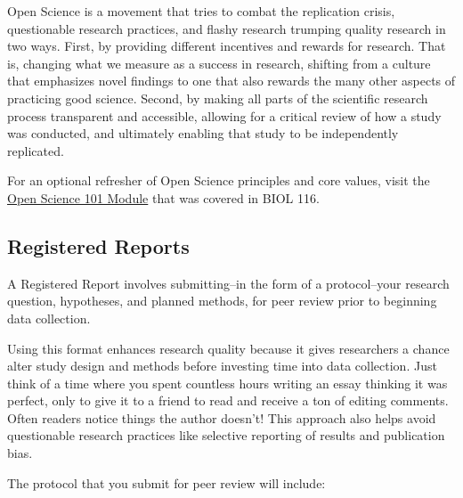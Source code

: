 \documentclass[
]{book}
\begin{document}
Open Science is a movement that tries to combat the replication crisis, questionable research practices, and flashy research trumping quality research in two ways. First, by providing different incentives and rewards for research. That is, changing what we measure as a success in research, shifting from a culture that emphasizes novel findings to one that also rewards the many other aspects of practicing good science. Second, by making all parts of the scientific research process transparent and accessible, allowing for a critical review of how a study was conducted, and ultimately enabling that study to be independently replicated.

For an optional refresher of Open Science principles and core values, visit the \href{https://ubco-biology.github.io/OS-Introduction/principles-of-open-science.html}{Open Science 101 Module} that was covered in BIOL 116.

\hypertarget{registered-reports}{%
\subsection*{Registered Reports}\label{registered-reports}}

A Registered Report involves submitting--in the form of a protocol--your research question, hypotheses, and planned methods, for peer review prior to beginning data collection.

Using this format enhances research quality because it gives researchers a chance alter study design and methods before investing time into data collection. Just think of a time where you spent countless hours writing an essay thinking it was perfect, only to give it to a friend to read and receive a ton of editing comments. Often readers notice things the author doesn't! This approach also helps avoid questionable research practices like selective reporting of results and publication bias.

The protocol that you submit for peer review will include:
\end{document}
